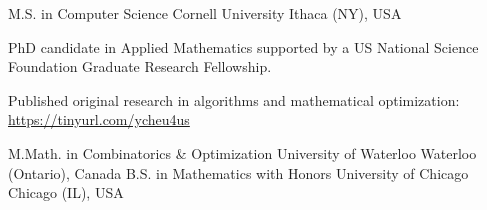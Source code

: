 

\begin{cventries}

  \cventry
    {M.S. in Computer Science} %
    {Cornell University} %
    {Ithaca (NY), USA} %
    {} %
    {
      \begin{cvitems} %
        \item {PhD candidate in Applied Mathematics supported by a US National Science Foundation Graduate Research Fellowship.}
        \item {Published original research in algorithms and mathematical optimization: \url{https://tinyurl.com/ycheu4us}}
      \end{cvitems}
    }

  \cventry
    {M.Math. in Combinatorics \& Optimization} %
    {University of Waterloo} %
    {Waterloo (Ontario), Canada} %
    {} %
    {}
  \vspace{-1.0mm}
  \cventry
    {B.S. in Mathematics with Honors} %
    {University of Chicago} %
    {Chicago (IL), USA} %
    {} %
    {}
  \vspace{-1.0mm}
\end{cventries}

